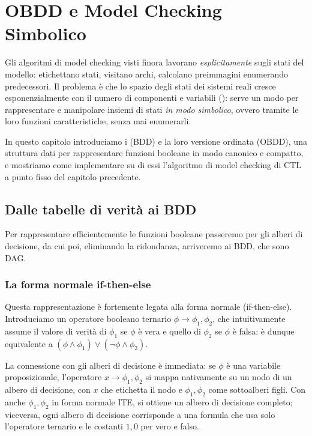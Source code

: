 \chapter{OBDD e Model Checking Simbolico}\label{ch:obdd}

Gli algoritmi di model checking visti finora lavorano \emph{esplicitamente} sugli stati del modello: etichettano stati, visitano archi, calcolano preimmagini enumerando predecessori. Il problema è che lo spazio degli stati dei sistemi reali cresce esponenzialmente con il numero di componenti e variabili (): serve un modo per rappresentare e manipolare insiemi di stati \emph{in modo simbolico}, ovvero tramite le loro funzioni caratteristiche, senza mai enumerarli.

In questo capitolo introduciamo i  (BDD) e la loro versione ordinata (OBDD), una struttura dati per rappresentare funzioni booleane in modo canonico e compatto, e mostriamo come implementare su di essi l'algoritmo di model checking di CTL a punto fisso del capitolo precedente.

\section{Dalle tabelle di verità ai BDD}

Per rappresentare efficientemente le funzioni booleane passeremo per gli alberi di decisione, da cui poi, eliminando la ridondanza, arriveremo ai BDD, che sono DAG\@.

\subsection{La forma normale if-then-else}

Questa rappresentazione è fortemente legata alla forma normale  (if-then-else). Introduciamo un operatore booleano ternario \(\phi \to \phi_1,\phi_2\), che intuitivamente assume il valore di verità di \(\phi_1\) se \(\phi\) è vera e quello di \(\phi_2\) se \(\phi\) è falsa: è dunque equivalente a \((\phi \land \phi_1) \lor (\neg \phi \land \phi_2)\).

La connessione con gli alberi di decisione è immediata: se \(\phi\) è una variabile proposizionale, l'operatore \(x\to \phi_1,\phi_2\) si mappa nativamente su un nodo di un albero di decisione, con \(x\) che etichetta il nodo e \(\phi_1,\phi_2\) come sottoalberi figli. Con anche \(\phi_1,\phi_2\) in forma normale ITE, si ottiene un albero di decisione completo; viceversa, ogni albero di decisione corrisponde a una formula che usa solo l'operatore ternario e le costanti \(1, 0\) per vero e falso.

